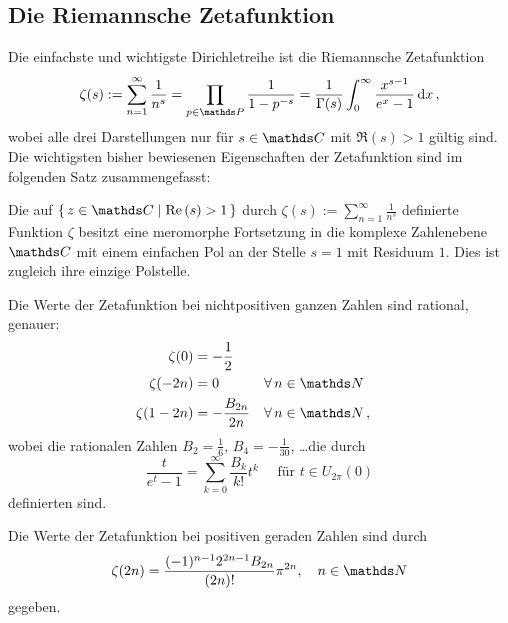 \subsection{Die Riemannsche Zetafunktion}

Die einfachste und wichtigste Dirichletreihe ist die Riemannsche Zetafunktion
\[
	\zeta(s) 
	:= \sum_{n=1}^\infty \frac 1{n^s}
	= \prod_{p \in \PP} \frac 1{1 - p^{-s}}
	= \frac 1{\Gamma(s)} \int_0^\infty \frac {x^{s-1}}{e^x - 1} \opd x
	\,,
\]
wobei alle drei Darstellungen nur für $s \in \CC$ mit $\Re(s) > 1$ gültig sind. Die wichtigsten bisher bewiesenen Eigenschaften der Zetafunktion sind im folgenden Satz zusammengefasst:

\begin{satz}
Die auf $\Set {z \in \CC \mid \Re(s) > 1}$ durch $\zeta(s) := \sum_{n=1}^\infty \frac 1{n^s}$ definierte Funktion $\zeta$ besitzt eine meromorphe Fortsetzung in die komplexe Zahlenebene $\CC$ mit einem einfachen Pol an der Stelle $s = 1$ mit Residuum $1$. Dies ist zugleich ihre einzige Polstelle. 

Die Werte der Zetafunktion bei nichtpositiven ganzen Zahlen sind rational, genauer:
\begin{align*}
	\zeta(0) &= - \frac 12 \\
	\zeta(-2n) &= 0 && \forall \, n \in \NN \\
	\zeta(1-2n) &= - \frac {B_{2n}}{2n} && \forall \, n \in \NN
	\,,
\end{align*}
wobei die rationalen Zahlen $B_2 = \frac 16$, $B_4 = - \frac 1{30}$, \ldots die durch
\[
	\frac t{e^t - 1} = \sum_{k=0}^\infty \frac {B_k}{k!} t^k \quad \text{ für } t \in U_{2\pi}(0)
\]
definierten  sind. 

Die Werte der Zetafunktion bei positiven geraden Zahlen sind durch
\[
	\zeta(2n) = \frac {(-1)^{n-1} 2^{2n-1} B_{2n}}{(2n)!} \pi^{2n}, \quad n \in \NN
\]
gegeben.
\end{satz}

